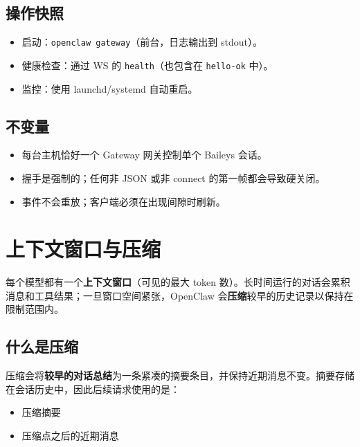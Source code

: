 \subsection{操作快照}


\begin{itemize}
  \item 启动：\texttt{openclaw gateway}（前台，日志输出到 stdout）。
  \item 健康检查：通过 WS 的 \texttt{health}（也包含在 \texttt{hello-ok} 中）。
  \item 监控：使用 launchd/systemd 自动重启。
\end{itemize}


\subsection{不变量}


\begin{itemize}
  \item 每台主机恰好一个 Gateway 网关控制单个 Baileys 会话。
  \item 握手是强制的；任何非 JSON 或非 connect 的第一帧都会导致硬关闭。
  \item 事件不会重放；客户端必须在出现间隙时刷新。
\end{itemize}



\clearpage

\section{上下文窗口与压缩}


每个模型都有一个\textbf{上下文窗口}（可见的最大 token 数）。长时间运行的对话会累积消息和工具结果；一旦窗口空间紧张，OpenClaw 会\textbf{压缩}较早的历史记录以保持在限制范围内。

\subsection{什么是压缩}


压缩会将\textbf{较早的对话总结}为一条紧凑的摘要条目，并保持近期消息不变。摘要存储在会话历史中，因此后续请求使用的是：

\begin{itemize}
  \item 压缩摘要
  \item 压缩点之后的近期消息
\end{itemize}



